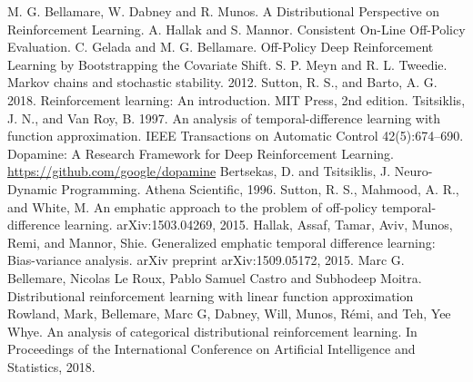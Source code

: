 \documentclass[12pt,a4paper,openright,twoside]{article}
\numberwithin{equation}{section}
\theoremstyle{definition}
\theoremstyle{remark}
\theoremstyle{plain}
\begin{document}
\thispagestyle{plain}
\begin{thebibliography}{50}

	 M. G. Bellamare, W. Dabney and R. Munos. A Distributional Perspective on Reinforcement Learning.
	 A. Hallak and S. Mannor. Consistent On-Line Off-Policy Evaluation.
	 C. Gelada and M. G. Bellamare. Off-Policy Deep Reinforcement Learning by Bootstrapping the Covariate Shift.
	  S. P. Meyn and R. L. Tweedie. Markov chains and stochastic stability. 2012.
	 Sutton, R. S., and Barto, A. G. 2018. Reinforcement learning: An introduction. MIT Press, 2nd edition.
	 Tsitsiklis, J. N., and Van Roy, B. 1997. An analysis of temporal-difference learning with function approximation. IEEE Transactions on Automatic Control 42(5):674–690.
	 Dopamine: {A} Research Framework for Deep Reinforcement Learning. \url{https://github.com/google/dopamine}
	 Bertsekas, D. and Tsitsiklis, J. Neuro-Dynamic Programming. Athena Scientific, 1996.
	 Sutton, R. S., Mahmood, A. R., and White, M. An emphatic approach to the problem of off-policy temporal- difference learning. arXiv:1503.04269, 2015.
	 Hallak, Assaf, Tamar, Aviv, Munos, Remi, and Mannor, Shie. Generalized emphatic temporal difference learning: Bias-variance analysis. arXiv preprint arXiv:1509.05172, 2015.
	 Marc G. Bellemare, Nicolas Le Roux, Pablo Samuel Castro and Subhodeep Moitra. Distributional reinforcement learning with linear function approximation
	 Rowland, Mark, Bellemare, Marc G, Dabney, Will, Munos, Rémi, and Teh, Yee Whye. An analysis of categorical distributional reinforcement learning. In Proceedings of the International Conference on Artificial Intelligence and Statistics, 2018.





\end{thebibliography}


\end{document}
